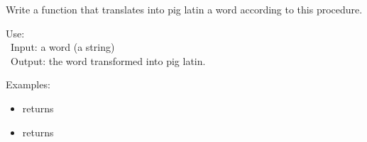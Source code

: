 \documentclass[11pt,class=report,crop=false]{standalone}
\begin{document}
\begin{activite}
\begin{enumerate}
\begin{itemize}
   
 \end{itemize}
 
  Write a  function that translates into pig latin a word according to this procedure.
  
  \begin{fonction}
  Use:  \\\
  Input: a word (a string) \\\
  Output: the word transformed into pig latin.
  
  \medskip
    
  Examples: 
  \begin{itemize}
    \item {} returns 
    \item {} returns 
  \end{itemize}    
  \end{fonction} 
  

\end{enumerate} 

\end{activite}


\end{document}
